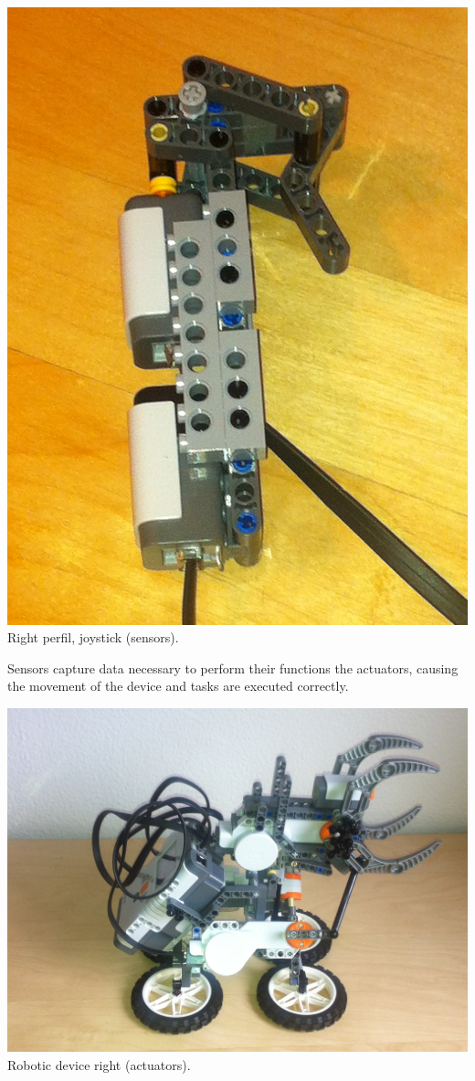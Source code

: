 \documentclass[a4paper,11pt]{article}
\begin{document}
\begin{multicols}{2}
			\begin{center}
				\includegraphics[scale=0.1]{img/joystick_right.png}\\
				Right perfil, joystick (sensors).
			\end{center}

			Sensors capture data necessary to perform their functions the actuators, causing the movement of the device and tasks are executed correctly.\\

			\begin{center}
				\includegraphics[scale=0.2]{img/robot1.png}\\
				Robotic device right (actuators).
			\end{center}


\end{multicols}
\end{document}
